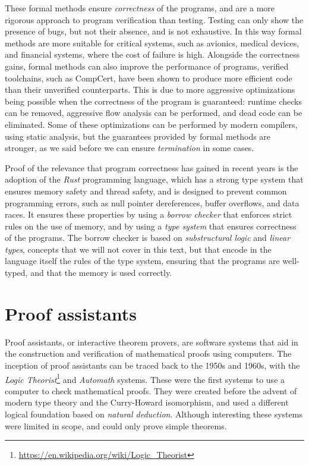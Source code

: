 \documentclass[
  a4paper, 
  10pt, 
  parskip=half, 
  DIV=20,
  toc=bibliography,
  usegeometry,
]{scrartcl}
\begin{document}
These formal methods ensure \emph{correctness} of the programs, and are a more
rigorous approach to program verification than testing. Testing can only show
the presence of bugs, but not their absence, and is not exhaustive. In this way
formal methods are more suitable for critical systems, such as avionics, medical
devices, and financial systems, where the cost of failure is high. Alongside the
correctness gains, formal methods can also improve the performance of programs,
verified toolchains, such as CompCert, have been shown to produce more
efficient code than their unverified counterparts. This is due to more
aggressive optimizations being possible when the correctness of the program is
guaranteed: runtime checks can be removed, aggressive flow analysis can be
performed, and dead code can be eliminated. Some of these optimizations can be
performed by modern compilers, using static analysis, but the guarantees
provided by formal methods are stronger, as we said before we can ensure
\emph{termination} in some cases.

Proof of the relevance that program correctness has gained in recent years is
the adoption of the \emph{Rust} programming language, which has a strong type system
that ensures memory safety and thread safety, and is designed to prevent common
programming errors, such as null pointer dereferences, buffer overflows, and
data races. It ensures these properties by using a \emph{borrow checker} that
enforces strict rules on the use of memory, and by using a \emph{type system} that
ensures correctness of the programs. The borrow checker is based on
\emph{substructural logic} and \emph{linear types}, concepts that we will not cover in
this text, but that encode in the language itself the rules of the type system,
ensuring that the programs are well-typed, and that the memory is used
correctly.

\section{Proof assistants}

Proof assistants, or interactive theorem provers, are software systems that aid
in the construction and verification of mathematical proofs using computers. The
inception of proof assistants can be traced back to the 1950s and 1960s, with
the \emph{Logic Theorist}\footnote{\url{https://en.wikipedia.org/wiki/Logic_Theorist}} 
and \emph{Automath} systems. These were the
first systems to use a computer to check mathematical proofs. They were
created before the advent of modern type theory and the Curry-Howard
isomorphism, and used a different logical foundation based on \emph{natural
deduction}. Although interesting these systems were limited in scope, and
could only prove simple theorems.
\end{document}
